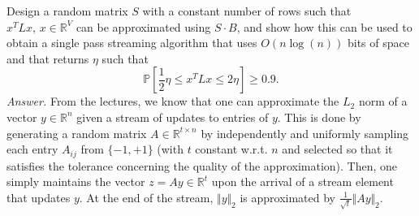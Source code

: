 \documentclass[10pt,usenames,dvipsnames]{article}
\newcommand{\R}{\mathbb{R}}
\newcommand{\Pbb}{\mathbb{P}}
\newenvironment{exercise}[2][Exercise]{\begin{trivlist}
  \item[\hskip \labelsep {\bfseries #1}\hskip \labelsep {\bfseries #2.}]}{\end{trivlist}}
\begin{document}
   \begin{exercise}{3b}
   Design a random matrix $S$ with a constant number of rows such that $x^TLx, \, x\in \R^V$ can be approximated using $S\cdot B$, and show how this can be used to obtain a single pass streaming algorithm that uses $O(n\log(n))$ bits of space and that returns $\eta$ such that 
   $$
   \Pbb[\frac{1}{2} \eta \leq x^TLx \leq 2\eta] \geq 0.9.
  $$
\textit{Answer.} From the lectures, we know that one can approximate the $L_2$ norm of a vector $y\in\R^n$ given a stream of updates to entries of $y$. This is done by generating a random matrix $A\in \R^{t\times n}$ by independently and uniformly sampling each entry $A_{ij}$ from $\{-1,+1\}$ (with $t$ constant w.r.t. $n$ and selected so that it satisfies the tolerance concerning the quality of the approximation). Then,  one simply maintains the vector $z = Ay \in \R^t$  upon the arrival of a stream element that updates $y$. At the end of the stream, $ \Vert y \Vert_2$ is approximated by $\frac{1}{\sqrt{t}}\Vert Ay \Vert_2$.


\end{exercise}
\end{document}
